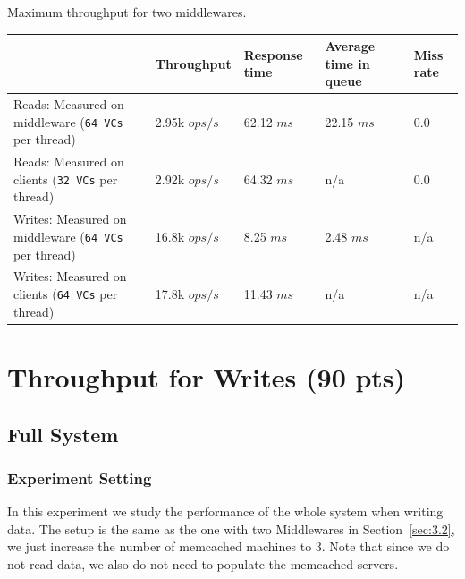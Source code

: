 \documentclass[11pt,a4paper]{article}
\begin{document}
\begin{center}
	{Maximum throughput for two middlewares.}
    \scriptsize{
	\begin{tabular}{|l|p{2cm}|p{2cm}|p{2cm}|p{2cm}|}
		\hline                                & Throughput & Response time & Average time in queue & Miss rate \\ 
        \hline Reads: Measured on middleware (\texttt{64 VCs} per thread) & 2.95k $ops/s$ & 62.12 $ms$ & 22.15 $ms$            & 0.0       \\ 
		\hline Reads: Measured on clients (\texttt{32 VCs} per thread) & 2.92k $ops/s$ & 64.32 $ms$ & n/a                   & 0.0       \\ 
        \hline Writes: Measured on middleware  (\texttt{64 VCs} per thread) & 16.8k $ops/s$ & 8.25 $ms$ & 2.48 $ms$             & n/a       \\ 
        \hline Writes: Measured on clients   (\texttt{64 VCs} per thread)  & 17.8k $ops/s$ & 11.43 $ms$ & n/a                   & n/a       \\
		\hline 
	\end{tabular}
}
\end{center}

\section{Throughput for Writes (90 pts)}
\label{sec:4.1}

\subsection{Full System}

\subsubsection*{Experiment Setting}

In this experiment we study the performance of the whole system when writing data.
The setup is the same as the one with two Middlewares in Section~\ref{sec:3.2}, we just increase the number of memcached machines to 3. Note that since we do not read data, we also do not need to populate the memcached servers.
\end{document}
